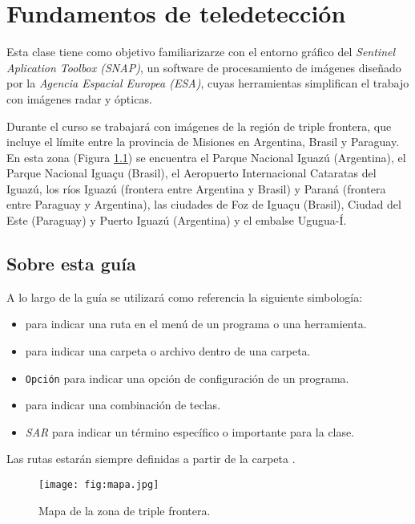 \chapter{Fundamentos de teledetección}

Esta clase tiene como objetivo familiarizarze con el entorno gráfico del \emph{Sentinel Aplication Toolbox (SNAP)}, un software de procesamiento de imágenes diseñado por la \emph{Agencia Espacial Europea (ESA)}, cuyas herramientas simplifican el trabajo con imágenes radar y ópticas.

Durante el curso se trabajará con imágenes de la región de triple frontera, que incluye el límite entre la provincia de Misiones en Argentina, Brasil y Paraguay. En esta zona (Figura \ref{fig:mapa}) se encuentra el Parque Nacional Iguazú (Argentina), el Parque Nacional Iguaçu (Brasil), el Aeropuerto Internacional Cataratas del Iguazú, los ríos Iguazú (frontera entre Argentina y Brasil) y Paraná (frontera entre Paraguay y Argentina), las ciudades de Foz de Iguaçu (Brasil), Ciudad del Este (Paraguay) y Puerto Iguazú (Argentina) y el embalse Ugugua-Í.

\section{Sobre esta guía}

A lo largo de la guía se utilizará como referencia la siguiente simbología:

\begin{itemize}
  \item {} para indicar una ruta en el menú de un programa o una herramienta.
  \item {} para indicar una carpeta o archivo dentro de una carpeta.
  \item \texttt{Opción} para indicar una opción de configuración de un programa.
  \item {} para indicar una combinación de teclas.
  \item \emph{SAR} para indicar un término específico o importante para la clase.
\end{itemize}

Las rutas estarán siempre definidas a partir de la carpeta .

\begin{landscape}
  \begin{figure}[h!]
      \centering
      \texttt{[image: fig:mapa.jpg]}
      \caption{Mapa de la zona de triple frontera.}
      \label{fig:mapa}
  \end{figure}
\end{landscape}


